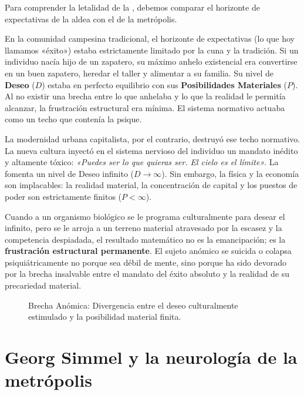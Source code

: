Para comprender la letalidad de la \Anomia, debemos comparar el horizonte de expectativas de la aldea con el de la metrópolis. 

En la comunidad campesina tradicional, el horizonte de expectativas (lo que hoy llamamos «éxito») estaba estrictamente limitado por la cuna y la tradición. Si un individuo nacía hijo de un zapatero, su máximo anhelo existencial era convertirse en un buen zapatero, heredar el taller y alimentar a su familia. Su nivel de \textbf{Deseo} ($D$) estaba en perfecto equilibrio con sus \textbf{Posibilidades Materiales} ($P$). Al no existir una brecha entre lo que anhelaba y lo que la realidad le permitía alcanzar, la frustración estructural era mínima. El sistema normativo actuaba como un techo que contenía la psique.

La modernidad urbana capitalista, por el contrario, destruyó ese techo normativo. La nueva cultura inyectó en el sistema nervioso del individuo un mandato inédito y altamente tóxico: \textit{«Puedes ser lo que quieras ser. El cielo es el límite»}. La \Gesellschaft{} fomenta un nivel de Deseo infinito ($D \to \infty$). Sin embargo, la física y la economía son implacables: la realidad material, la concentración de capital y los puestos de poder son estrictamente finitos ($P < \infty$). 

Cuando a un organismo biológico se le programa culturalmente para desear el infinito, pero se le arroja a un terreno material atravesado por la escasez y la competencia despiadada, el resultado matemático no es la emancipación; es la \textbf{frustración estructural permanente}. El sujeto anómico se suicida o colapsa psiquiátricamente no porque sea débil de mente, sino porque ha sido devorado por la brecha insalvable entre el mandato del éxito absoluto y la realidad de su precariedad material.

\begin{figure}[htbp]
    \centering
    
    \caption{Brecha Anómica: Divergencia entre el deseo culturalmente estimulado y la posibilidad material finita.}
    \label{fig:brecha_anomica}
\end{figure}

\section{Georg Simmel y la neurología de la metrópolis}

